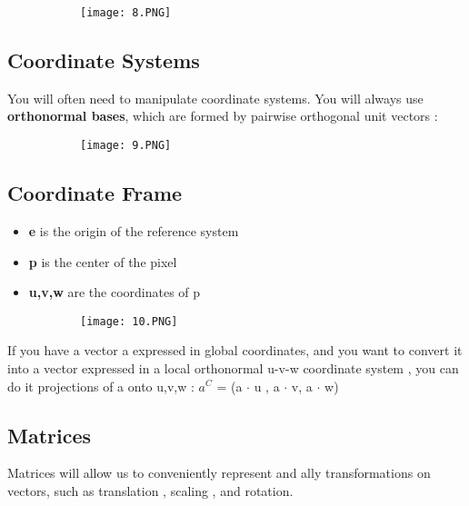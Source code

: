 \documentclass{article}
\begin{document}
\begin{figure}[ht!]
  \centering
  \begin{subfigure}[b]{0.2\linewidth}
    \texttt{[image: 8.PNG]}
  \end{subfigure}
\end{figure}

\subsection{Coordinate Systems}
You will often need to manipulate coordinate systems. You will always use \textbf{orthonormal bases}, which are formed by pairwise orthogonal unit vectors : \begin{figure}[ht!]
  \centering
  \begin{subfigure}[b]{0.2\linewidth}
    \texttt{[image: 9.PNG]}
  \end{subfigure}
\end{figure}

\subsection{Coordinate Frame}

\begin{itemize}
    \item \textbf{e} is the origin of the reference system 
    \item \textbf{p} is the center of the pixel
    \item \textbf{u,v,w} are the coordinates of p
\end{itemize}

\begin{figure}[ht!]
  \centering
  \begin{subfigure}[b]{0.2\linewidth}
    \texttt{[image: 10.PNG]}
  \end{subfigure}
\end{figure}

If you have a vector a expressed in global coordinates, and you want to convert it into a vector expressed in a local orthonormal u-v-w coordinate system , you can do it projections of a onto u,v,w : $a^C$ = (a $\cdot$ u , a $\cdot$ v, a $\cdot$ w)

\subsection{Matrices}
Matrices will allow us to conveniently represent and ally transformations on vectors, such as translation , scaling , and rotation.
\end{document}
